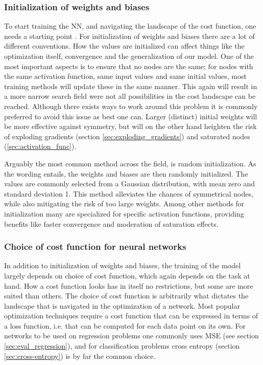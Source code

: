 \subsubsection{Initialization of weights and biases}\label{sec:NN_init}

To start training the NN, and navigating the landscape of the cost function, one needs a starting point \citep[p.297]{Goodfellow-et-al-2016}. For initialization of weights and biases there are a lot of different conventions. How the values are initialized can affect things like the optimization itself, convergence and the generalization of our model. 
One of the most important aspects is to ensure that no nodes are the same; for nodes with the same activation function, same input values and same initial values, most training methods will update these in the same manner. This again will result in a more narrow search field were not all possibilities in the cost landscape can be reached. Although there exists ways to work around this problem it is commonly preferred to avoid this issue as best one can. 
Larger (distinct) initial weights will be more effective against symmetry, but will on the other hand heighten the risk of exploding gradients (section \ref{sec:exploding_gradients}) and saturated nodes (\ref{sec:activation_func}). 


Arguably the most common method across the field, is random initialization. As the wording entails, the weights and biases are then randomly initialized. The values are commonly selected from a Gaussian distribution, with mean zero and standard deviation 1. This method alleviates the chances of symmetrical nodes, while also mitigating the risk of too large weights. Among other methods for initialization many are specialized for specific activation functions, providing benefits like faster convergence and moderation of saturation effects. 

\subsubsection{Choice of cost function for neural networks}
In addition to initialization of weights and biases, the training of the model largely depends on choice of cost function, which again depends on the task at hand. How a cost function looks has in itself no restrictions, but some are more suited than others.
The choice of cost function is arbitrarily what dictates the landscape that is navigated in the optimization of a network. Most popular optimization techniques require a cost function that can be expressed in terms of a loss function, i.e. that can be computed for each data point on its own. 
For networks to be used on regression problems one commonly uses MSE (see section \ref{sec:eval_regression}), and for classification problems cross entropy (section \ref{sec:cross-entropy}) is by far the common choice. 

